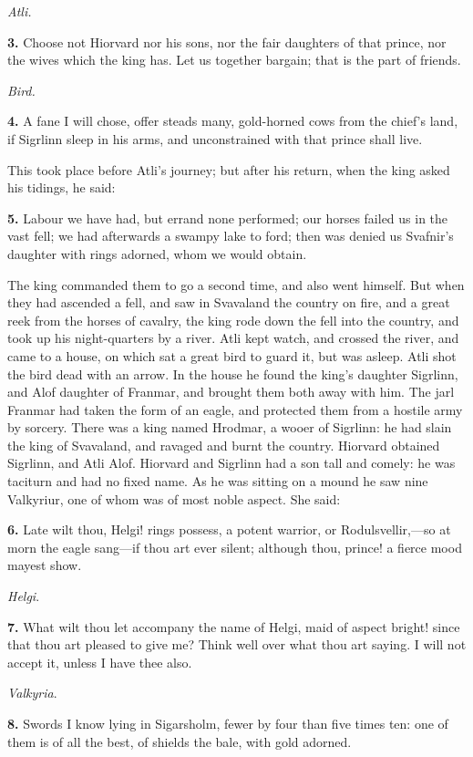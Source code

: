 \emph{Atli.}

\textbf{3.} Choose not Hiorvard nor his sons, nor the fair daughters of that
prince, nor the wives which the king has. Let us together bargain;
that is the part of friends.

\emph{Bird.}

\textbf{4.} A fane I will chose, offer steads many, gold-horned cows from the
chief's land, if Sigrlinn sleep in his arms, and unconstrained with
that prince shall live.

This took place before Atli's journey; but after his return, when the
king asked his tidings, he said:

\textbf{5.} Labour we have had, but errand none performed; our horses failed
us in the vast fell; we had afterwards a swampy lake to ford; then was
denied us Svafnir's daughter with rings adorned, whom we would obtain.

The king commanded them to go a second time, and also went himself.
But when they had ascended a fell, and saw in Svavaland the country on
fire, and a great reek from the horses of cavalry, the king rode down
the fell into the country, and took up his night-quarters by a river.
Atli kept watch, and crossed the river, and came to a house, on which
sat a great bird to guard it, but was asleep. Atli shot the bird dead
with an arrow. In the house he found the king's daughter Sigrlinn, and
Alof daughter of Franmar, and brought them both away with him. The
jarl Franmar had taken the form of an eagle, and protected them from a
hostile army by sorcery. There was a king named Hrodmar, a wooer of
Sigrlinn: he had slain the king of Svavaland, and ravaged and burnt
the country. Hiorvard obtained Sigrlinn, and Atli Alof. Hiorvard and
Sigrlinn had a son tall and comely: he was taciturn and had no fixed
name. As he was sitting on a mound he saw nine Valkyriur, one of whom
was of most noble aspect. She said:

\textbf{6.} Late wilt thou, Helgi! rings possess, a potent warrior, or
Rodulsvellir,—so at morn the eagle sang—if thou art ever silent;
although thou, prince! a fierce mood mayest show.

\emph{Helgi}.

\textbf{7.} What wilt thou let accompany the name of Helgi, maid of aspect
bright! since that thou art pleased to give me? Think well over what
thou art saying. I will not accept it, unless I have thee also.

\emph{Valkyria}.

\textbf{8.} Swords I know lying in Sigarsholm, fewer by four than five times
ten: one of them is of all the best, of shields the bale, with gold
adorned.

